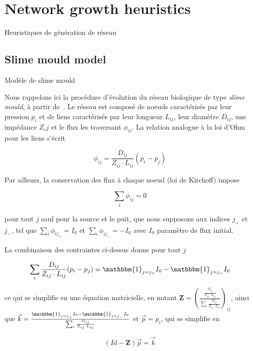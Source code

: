 




\newpage

\section{Network growth heuristics}{Heuristiques de génération de réseau}

\label{app:sec:networkgrowth}



\subsection{Slime mould model}{Modèle de slime mould}

Nous rappelons ici la procédure d'évolution du réseau biologique de type \emph{slime mould}, à partir de~\cite{tero2007mathematical}. Le réseau est composé de noeuds caractérisés par leur pression $p_i$ et de liens caractérisés par leur longueur $L_{ij}$, leur diamètre $D_{ij}$, une impédance $Z_ij$ et le flux les traversant $\phi_{ij}$. La relation analogue à la loi d'Ohm pour les liens s'écrit

\[
\phi_{ij} = \frac{D_{ij}}{Z_{ij}\cdot L_{ij}} \left(p_i - p_j\right)
\]

Par ailleurs, la conservation des flux à chaque noeud (loi de Kirchoff) impose

\[
\sum_i \phi_{ij} = 0
\]

pour tout $j$ sauf pour la source et le puit, que nous supposons aux indices $j_+$ et $j_-$, tel que $\sum_i \phi_{ij_+} = I_0$ et $\sum_i \phi_{ij_-} = -I_0$ avec $I_0$ paramètre de flux initial.

La combinaison des contraintes ci-dessus donne pour tout $j$

\[
\sum_i \frac{D_{ij}}{Z_{ij}\cdot L_{ij}} (p_i - p_j) = \mathbbm{1}_{j=j_+} I_0 - \mathbbm{1}_{j=j_-} I_0 
\]

ce qui se simplifie en une équation matricielle, en notant $\mathbf{Z} = \left(\frac{\frac{D_{ij}}{Z_{ij}\cdot L_{ij}}}{\sum_i \frac{D_{ij}}{Z_{ij}\cdot L_{ij}}}\right)_{ij}$, ainsi que $\vec{k} = \frac{\mathbbm{1}_{j=j_+} I_0 - \mathbbm{1}_{j=j_-} I_0 }{\sum_i \frac{D_{ij}}{Z_{ij}\cdot L_{ij}}}$ et $\vec{p} = p_i$, qui se simplifie en

\[
\left(Id - \mathbf{Z}\right) \vec{p} = \vec{k}
\]

